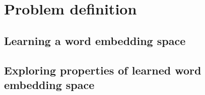 
\section{Problem definition}

\subsection{Learning a word embedding space}

\subsection{Exploring properties of learned word embedding space}